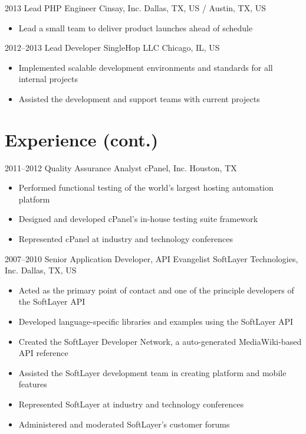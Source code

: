 \documentclass[11pt,a4paper,sans]{moderncv}
\begin{document}
  \cventry
    {2013}
    {Lead PHP Engineer}
    {Cinsay, Inc.}
    {Dallas, TX, US / Austin, TX, US}
    {}
    {
      \begin{itemize}
        \item Lead a small team to deliver product launches ahead of schedule
      \end{itemize}
    }

  \cventry
    {2012--2013}
    {Lead Developer}
    {SingleHop LLC}
    {Chicago, IL, US}
    {}
    {
      \begin{itemize}
        \item Implemented scalable development environments and standards for all internal projects
        \item Assisted the development and support teams with current projects
      \end{itemize}
    }
  \pagebreak

  \section{Experience (cont.)}

  \cventry
    {2011--2012}
    {Quality Assurance Analyst}
    {cPanel, Inc.}
    {Houston, TX}
    {}
    {
      \begin{itemize}
        \item Performed functional testing of the world's largest hosting automation platform
        \item Designed and developed cPanel's in-house testing suite framework
        \item Represented cPanel at industry and technology conferences
      \end{itemize}
    }

  \cventry
    {2007--2010}
    {Senior Application Developer, API Evangelist}
    {SoftLayer Technologies, Inc.}
    {Dallas, TX, US}
    {}
    {
      \begin{itemize}
        \item Acted as the primary point of contact and one of the principle developers of the SoftLayer API
        \item Developed language-specific libraries and examples using the SoftLayer API
        \item Created the SoftLayer Developer Network, a auto-generated MediaWiki-based API reference
        \item Assisted the SoftLayer development team in creating platform and mobile features
        \item Represented SoftLayer at industry and technology conferences
        \item Administered and moderated SoftLayer's customer forums
      \end{itemize}
    }
\end{document}
